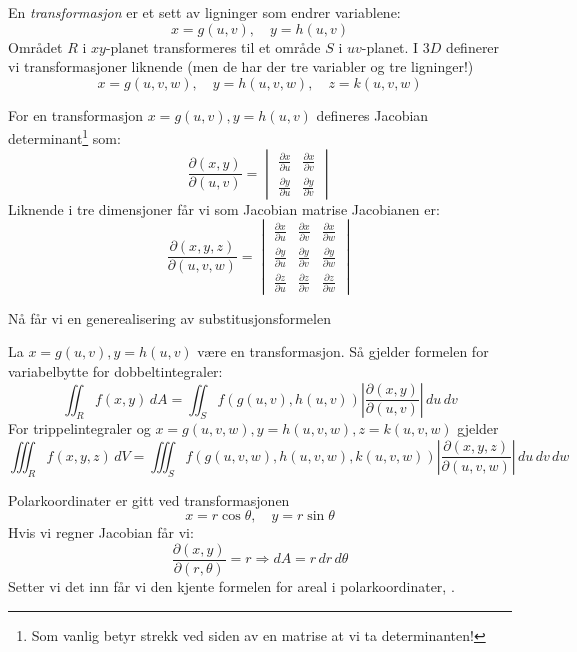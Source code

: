 
\begin{defn}[Transformasjoner]
En \emph{transformasjon} er et sett av ligninger som endrer variablene:
\[
x = g(u, v), \quad y = h(u, v)
\]
Området $R$ i $xy$-planet transformeres til et område $S$ i $uv$-planet.
I $3D$ definerer vi transformasjoner liknende (men de har der tre variabler og tre ligninger!)
\[
x = g(u, v,w), \quad y = h(u, v,w), \quad z = k(u,v,w)
\]
\end{defn}

\begin{defn}
For en transformasjon $x = g(u, v), y = h(u, v)$ defineres Jacobian determinant\footnote{Som vanlig betyr strekk ved siden av en matrise at vi ta determinanten!} som:
\[
\frac{\partial(x, y)}{\partial(u, v)} = \begin{vmatrix} \frac{\partial x}{\partial u} & \frac{\partial x}{\partial v} \\ \frac{\partial y}{\partial u} & \frac{\partial y}{\partial v} \end{vmatrix}
\]
Liknende i tre dimensjoner får vi som Jacobian matrise
Jacobianen er:
\[
\frac{\partial(x, y, z)}{\partial(u, v, w)} = \begin{vmatrix} \frac{\partial x}{\partial u} & \frac{\partial x}{\partial v} & \frac{\partial x}{\partial w} \\ \frac{\partial y}{\partial u} & \frac{\partial y}{\partial v} & \frac{\partial y}{\partial w} \\ \frac{\partial z}{\partial u} & \frac{\partial z}{\partial v} & \frac{\partial z}{\partial w} \end{vmatrix}
\]
\end{defn}
Nå får vi en generealisering av substitusjonsformelen 
\begin{tcolorbox}[colback=white,colframe=blue!75!black,title= Variabelbytte for dobbeltintegraler]
La $x=g(u,v),y=h(u,v)$ være en transformasjon. Så gjelder formelen for variabelbytte for dobbeltintegraler:
\[
\iint_R f(x, y)\, dA = \iint_S f(g(u, v), h(u, v))\left|\frac{\partial(x, y)}{\partial(u, v)}\right|\, du\, dv
\]
For trippelintegraler og $x=g(u,v,w),y=h(u,v,w),z=k(u,v,w)$ gjelder
\[
\iiint_R f(x, y, z)\, dV = \iiint_S f(g(u, v, w), h(u, v, w), k(u, v, w))\left|\frac{\partial(x, y, z)}{\partial(u, v, w)}\right|\, du\, dv\, dw
\]
\end{tcolorbox}

\begin{ex}[Polarkoordinater]
Polarkoordinater er gitt ved transformasjonen
\[
x = r\cos\theta, \quad y = r\sin\theta
\]
Hvis vi regner Jacobian får vi:
\[
\frac{\partial(x, y)}{\partial(r, \theta)} = r \Rightarrow dA = r\, dr\, d\theta
\]
Setter vi det inn får vi den kjente formelen for areal i polarkoordinater, .
\end{ex}

